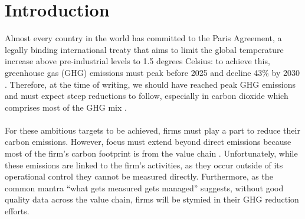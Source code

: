 \documentclass[12pt,twoside]{report}
\date{September 2024}
\begin{document}



\clearpage{\pagestyle{empty}\cleardoublepage}
\setcounter{page}{1}
\pagestyle{fancy}


\cleardoublepage

\clearpage{\pagestyle{empty}\cleardoublepage}

\tableofcontents 


\clearpage{\pagestyle{empty}\cleardoublepage}
\setcounter{page}{1}
\fancyhead[LE,RO]{\slshape \rightmark}
\fancyhead[LO,RE]{\slshape \leftmark}

\chapter{Introduction}

Almost every country in the world has committed to the Paris Agreement, a legally binding international treaty that aims to limit the global temperature increase above pre-industrial levels to 1.5 degrees Celsius: to achieve this, greenhouse gas (GHG) emissions must peak before 2025 and decline 43\% by 2030 \cite{unfcc2024}. Therefore, at the time of writing, we should have reached peak GHG emissions and must expect steep reductions to follow, especially in carbon dioxide which comprises most of the GHG mix \cite{Ritchie2023}. 
\\\\
For these ambitious targets to be achieved, firms must play a part to reduce their carbon emissions. However, focus must extend beyond direct emissions because most of the firm's carbon footprint is from the value chain \cite{ftserussell2024}. Unfortunately, while these emissions are linked to the firm's activities, as they occur outside of its operational control they cannot be measured directly. Furthermore, as the common mantra ``what gets measured gets managed'' suggests, without good quality data across the value chain, firms will be stymied in their GHG reduction efforts. 
\\\\
\end{document}
